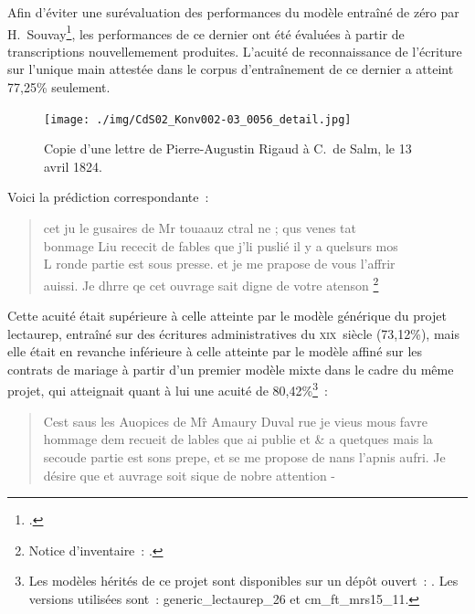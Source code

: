 \documentclass[a4paper,12pt,twoside]{book}
\newcommand{\siecle}[1]{\textsc{#1}\ieme}
\begin{document}
				Afin d'éviter une surévaluation des performances du modèle entraîné de zéro par H.~Souvay\footcite{souvayCorrespondanceConstanceSalm2021}, les performances de ce dernier ont été évaluées à partir de transcriptions nouvellemement produites. L'acuité de reconnaissance de l'écriture sur l'unique main attestée dans le corpus d'entraînement de ce dernier a atteint 77,25\% seulement. 
				
				\begin{figure}[!h]
					\centering
					\texttt{[image: ./img/CdS02\_Konv002-03\_0056\_detail.jpg]}%
					\caption{Copie d'une lettre de Pierre-Augustin Rigaud à C.~de Salm, le 13 avril 1824.}%
					\label{lettre-rigaud}%
				\end{figure}
				
				Voici la \gls{prédiction} correspondante~:
				
				\begin{quote}
					\textsf{cet ju le gusaires de Mr touaauz ctral ne ; qus venes tat\\
					bonmage Liu rececit de fables que j'li puslié il y a quelsurs mos\\
					L ronde partie est sous presse. et je me prapose de vous l'affrir\\
					auissi. Je dhrre qe cet ouvrage sait digne de votre atenson
					\footnote{Notice d'inventaire~: \cite{CdS02056}.}}
				\end{quote}
				
				Cette acuité était supérieure à celle atteinte par le modèle générique du projet \gls{lectaurep}, entraîné sur des écritures administratives du \siecle{xix}~siècle (73,12\%), mais elle était en revanche inférieure à celle atteinte par le modèle affiné sur les contrats de mariage à partir d'un premier modèle mixte dans le cadre du même projet, qui atteignait quant à lui une acuité de 80,42\%\footnote{Les modèles hérités de ce projet sont disponibles sur un dépôt ouvert~: \cite{KrakenModelsTranscription}. Les versions utilisées sont~: \textsf{generic\_lectaurep\_26} et \textsf{cm\_ft\_mrs15\_11}.}~:
				
				\begin{quote}
					\textsf{Cest saus les Auopices de M\^r Amaury Duval rue je vieus mous favre
					hommage dem recueit de lables que ai publie et \& a quetques mais
					la secoude partie est sons prepe, et se me propose de nans l'apnis
					aufri. Je désire que et auvrage soit sique de nobre attention -}
				\end{quote}
				
\end{document}
